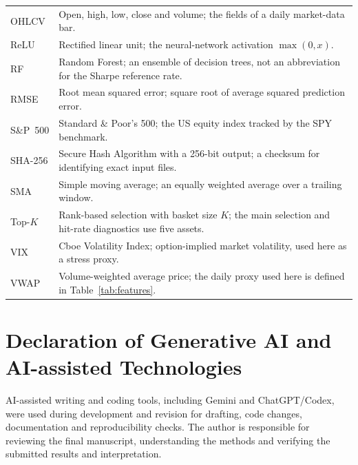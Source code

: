 \documentclass[3p,times]{elsarticle}
\begin{document}
\begin{tabularx}{\textwidth}{@{}p{}X@{}}
OHLCV & Open, high, low, close and volume; the fields of a daily market-data bar. \\
ReLU & Rectified linear unit; the neural-network activation $\max(0,x)$. \\
RF & Random Forest; an ensemble of decision trees, not an abbreviation for the Sharpe reference rate. \\
RMSE & Root mean squared error; square root of average squared prediction error. \\
S\&P~500 & Standard \& Poor's 500; the US equity index tracked by the SPY benchmark. \\
SHA-256 & Secure Hash Algorithm with a 256-bit output; a checksum for identifying exact input files. \\
SMA & Simple moving average; an equally weighted average over a trailing window. \\
Top-$K$ & Rank-based selection with basket size $K$; the main selection and hit-rate diagnostics use five assets. \\
VIX & Cboe Volatility Index; option-implied market volatility, used here as a stress proxy. \\
VWAP & Volume-weighted average price; the daily proxy used here is defined in Table~\ref{tab:features}. \\\bottomrule
\end{tabularx}
\endgroup
\clearpage
\section*{Declaration of Generative AI and AI-assisted Technologies}
AI-assisted writing and coding tools, including Gemini and ChatGPT/Codex, were used during development and revision for drafting, code changes, documentation and reproducibility checks. The author is responsible for reviewing the final manuscript, understanding the methods and verifying the submitted results and interpretation.

\end{document}
